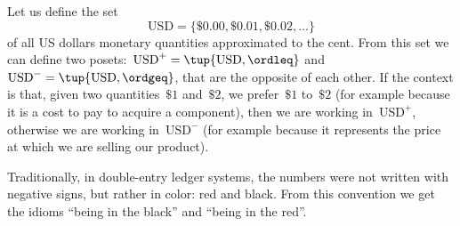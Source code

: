 \begin{example}
   Let us define the set
   \begin{equation*}
       \text{USD}=\{\$0.00,\$0.01,\$0.02,\dots\}
   \end{equation*}
   of all US dollars monetary quantities approximated to the cent.
   From this set we can define two posets:~$\text{USD}^{+} = \tup{\text{USD}, \ordleq}$ and~$\text{USD}^{-} = \tup{\text{USD}, \ordgeq}$, that are the opposite of each other.
   If the context is that, given two quantities~$\$1$ and~$\$2$, we prefer~$\$1$ to~$\$2$ (for example because it is a cost to pay to acquire a component), then we are working in~$\text{USD}^{+}$,
   otherwise we are working in~$\text{USD}^{-}$ (for example because it represents the price at which we are selling our product).

   Traditionally, in double-entry ledger systems, the numbers were not written with negative signs, but rather in color: red and black. From this convention we get the idioms ``being in the black'' and ``being in the red''.
\end{example}






